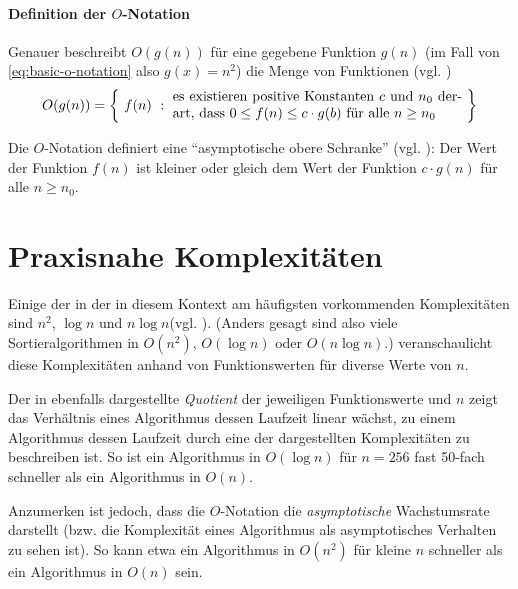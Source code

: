 \paragraph{Definition der $O$-Notation}

Genauer beschreibt $O(g(n))$ für eine gegebene Funktion $g(n)$ (im Fall von \eqref{eq:basic-o-notation} also $g(x) = n^2$) die Menge von Funktionen (vgl. \cite[37]{meh1984})
%
\begin{equation*}
    O(g(n))=\left\{\ 
        f(n)\ :\ \parbox{.6\textwidth}{
            es existieren positive Konstanten $c$ und $n_0$ derart, dass $0 \leq f(n) \leq c \cdot g(b)$ für alle $n \geq n_0$
        }
    \ \right\}
\end{equation*}

Die $O$-Notation definiert eine \enquote{asymptotische obere Schranke} (vgl. \cite[64]{sha2011}): Der Wert der Funktion $f(n)$ ist kleiner oder gleich dem Wert der Funktion $c \cdot g(n)$ für alle $n \geq n_0$.

\section{Praxisnahe Komplexitäten}
\label{sec:praxisnahe-komplexitäten}

Einige der in der in diesem Kontext am häufigsten vorkommenden Komplexitäten sind $n^2$, $\log n$ und $n \log n$\footnotemark (vgl. \cite[38]{hsr1997}). (Anders gesagt sind also viele Sortieralgorithmen in $O(n^2)$, $O(\log n)$ oder $O(n \log n)$.)  veranschaulicht diese Komplexitäten anhand von Funktionswerten für diverse Werte von $n$.


Der in  ebenfalls dargestellte \emph{Quotient} der jeweiligen Funktionswerte und $n$ zeigt das Verhältnis eines Algorithmus dessen Laufzeit linear wächst, zu einem Algorithmus dessen Laufzeit durch eine der dargestellten Komplexitäten zu beschreiben ist. So ist ein Algorithmus in $O(\log n)$ für $n = 256$ fast 50-fach schneller als ein Algorithmus in $O(n)$.

Anzumerken ist jedoch, dass die $O$-Notation die \emph{asymptotische} Wachstumsrate darstellt (bzw. die Komplexität eines Algorithmus als asymptotisches Verhalten zu sehen ist). So kann etwa ein Algorithmus in $O(n^2)$ für kleine $n$ schneller als ein Algorithmus in $O(n)$ sein.

